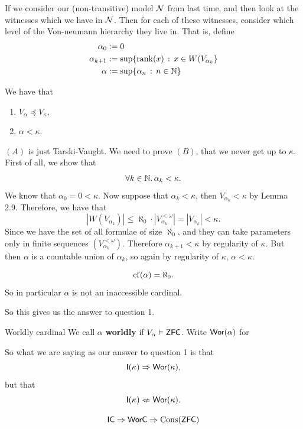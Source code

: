\documentclass{article}
\begin{document}
If we consider our  (non-transitive) model $\mathcal{N}$ from last time, and then look at the witnesses which we have in $\mathcal{N}$. Then for each of these witnesses, consider which level of the Von-neumann hierarchy they live in. That is, define \begin{align*}
    \alpha_{0} &:= 0\\
    \alpha_{k+1} &:= \sup \{\rank(x) \, : \, x \in W(V_{\alpha_{k}}\}\\
    \alpha &:= \sup\{\alpha_{n} \, : \, n \in \mathbb{N}\}
\end{align*}
\begin{fancythm}{}
    We have that
    \begin{enumerate}
        \item[(A)] $V_{\alpha} \preceq V_{\kappa},$
        \item [(B)] $ \alpha < \kappa.$
    \end{enumerate}
\end{fancythm}
\proof $(A)$ is just Tarski-Vaught. \gap 
We need to prove $(B)$, that we never get up to $\kappa$. First of all, we show that \[\forall k \in \mathbb{N}.\, \alpha_{k} < \kappa.\]
We know that $\alpha_0 = 0 < \kappa$. Now suppose that $\alpha_{k} < \kappa$, then $V_{\alpha_{k}} < \kappa$ by Lemma 2.9.\gap 
Therefore, we have that \[|W(V_{\alpha_{k}})| \leq \aleph_{0} \cdot |V_{\alpha_{k}}^{<\omega}| = |V_{\alpha_{k}}|<\kappa.\] Since we have the set of all formulae of size $\aleph_{0}$, and they can take parameters only in finite sequences $(V_{\alpha_{k}}^{< \omega})$. Therefore $\alpha_{k+1}< \kappa$ by regularity of $\kappa$. But then $\alpha$ is a countable union of $\alpha_{k}$, so again by regularity of $\kappa$, $\alpha < \kappa$.
\endproof
\begin{remark*}
    \[\operatorname{cf}(\alpha)=\aleph_{0}.\] So in particular $\alpha$ is not an inaccessible cardinal.
\end{remark*}
So this gives us the  answer to question 1. 
\begin{fancydefine}{Worldly cardinal}
    We call $\alpha$ \textbf{worldly} if $V_{\alpha} \vDash \mathsf{ZFC}$. Write $\mathsf{Wor}(\alpha)$ for 
\end{fancydefine}
So what we are saying as our answer to question 1 is that \[ \mathsf{I}(\kappa) \Rightarrow \mathsf{Wor}(\kappa),\] but that \[ \mathsf{I}(\kappa) \nLeftarrow \mathsf{Wor}(\kappa).\]
\begin{corr}{}
    \[ \mathsf{IC} \Rightarrow \mathsf{WorC} \Rightarrow \operatorname{Cons}(\mathsf{ZFC})\]
\end{corr}
\end{document}
